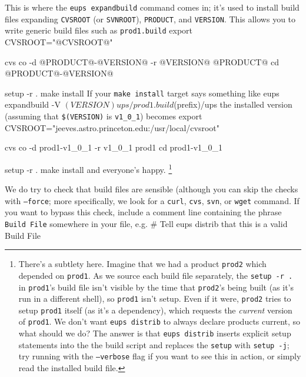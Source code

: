 \documentclass{article}
\newcommand{\code}[1]{\texttt{#1}}
\let\overbatim=\verbatim
\let\oendverbatim=\endverbatim
\renewenvironment{verbatim}
{\center\minipage{16cm}\overbatim}
{\oendverbatim\endminipage\endcenter}
\begin{document}
This is where the \code{eups expandbuild} command comes in;  it's used to install
build files expanding \code{CVSROOT} (or \code{SVNROOT}), \code{PRODUCT}, and
\code{VERSION}.  This allows you to write generic build files such as \code{prod1.build}
\begin{verbatim}
    export CVSROOT="@CVSROOT@"

    cvs co -d @PRODUCT@-@VERSION@ -r @VERSION@ @PRODUCT@
    cd @PRODUCT@-@VERSION@

    setup -r .
    make install
\end{verbatim}
If your \code{make install} target says something like
\begin{verbatim}
      eups expandbuild -V $(VERSION) ups/prod1.build $(prefix)/ups
\end{verbatim}
the installed version (assuming that \code{\$(VERSION)} is
\code{v1\_0\_1}) becomes
\begin{verbatim}
    export CVSROOT="jeeves.astro.princeton.edu:/usr/local/cvsroot"

    cvs co -d prod1-v1_0_1 -r v1_0_1 prod1
    cd prod1-v1_0_1

    setup -r .
    make install  
\end{verbatim}
and everyone's happy.  \footnote{
There's a subtlety here.  Imagine that we had a product \code{prod2}
which depended on \code{prod1}.
As we source each build file separately,
the \code{setup -r .} in \code{prod1}'s build file isn't visible by
the time that \code{prod2}'s being built (as it's run in a different shell), so
\code{prod1} isn't setup.  Even if it were, \code{prod2}
tries to setup \code{prod1} itself (as it's a dependency), which requests the \emph{current} version
of \code{prod1}.  We don't want \code{eups distrib} to always declare
products current, so what should we do?  The answer is that \code{eups distrib}
inserts explicit setup statements into the the build script
and replaces the \code{setup} with \code{setup -j}; try
running with the \code{--verbose} flag if you want to see this in action,
or simply read the installed build file.
}

We do try to check that build files are sensible (although you can skip the
checks with \code{--force};  more specifically, we look for a \code{curl},
\code{cvs}, \code{svn}, or \code{wget} command.  If you want to bypass
this check, include a comment line containing the phrase \code{Build File}
somewhere in your file, e.g.
\begin{verbatim}
# Tell eups distrib that this is a valid Build File
\end{verbatim}
\end{document}
